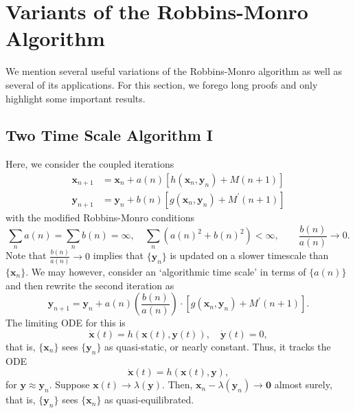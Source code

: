 \section{Variants of the Robbins-Monro Algorithm}

We mention several useful variations of the Robbins-Monro algorithm as well as several of its applications. For this section, we forego long proofs and only highlight some important results. 

\subsection{Two Time Scale Algorithm I}

Here, we consider the coupled iterations
\begin{align*}
    \mathbf{x}_{n+1} &= \mathbf{x}_n + a(n) \left[ h(\mathbf{x}_n,\mathbf{y}_n) + M(n+1) \right] \\
    \mathbf{y}_{n+1} &= \mathbf{y}_n + b(n) \left[ g(\mathbf{x}_n,\mathbf{y}_n) + M^{\prime}(n+1) \right]
\end{align*}
with the modified Robbins-Monro conditions
\[
    \sum_{n} a(n) = \sum_n b(n) = \infty, \quad \sum_n (a(n)^2 + b(n)^2) < \infty, \quad  \quad \frac{b(n)}{a(n)} \to 0.
\]
Note that $\frac{b(n)}{a(n)} \to 0$ implies that $\{\mathbf{y}_n\}$ is updated on a slower timescale than $\{\mathbf{x}_n\}$. We may however, consider an `algorithmic time scale' in terms of $\{a(n)\}$ and then rewrite the second iteration as
\[
    \mathbf{y}_{n+1} = \mathbf{y}_n + a(n) \left( \frac{b(n)}{a(n)} \right) \cdot \left[ g(\mathbf{x}_n,\mathbf{y}_n) + M^{\prime}(n+1) \right].
\]
The limiting ODE for this is
\[
    \dot{\mathbf{x}}(t) = h(\mathbf{x}(t), \mathbf{y}(t)), \quad \dot{\mathbf{y}}(t) = 0,
\]
that is, $\{\mathbf{x}_n\}$ sees $\{\mathbf{y}_n\}$ as quasi-static, or nearly constant. Thus, it tracks the ODE
\[
    \dot{\mathbf{x}}(t) = h(\mathbf{x}(t),\mathbf{y}),
\]
for $\mathbf{y} \approx \mathbf{y}_n$. Suppose $\mathbf{x}(t) \to \lambda(\mathbf{y})$. Then, $\mathbf{x}_n - \lambda(\mathbf{y}_n) \to \mathbf{0}$ almost surely, that is, $\{\mathbf{y}_n\}$ sees $\{\mathbf{x}_n\}$ as quasi-equilibrated. 

